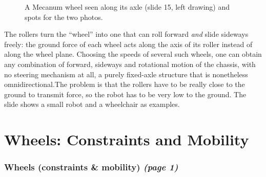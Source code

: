 \documentclass[11pt,a4paper]{article}
\theoremstyle{definition}
\theoremstyle{plain}
\theoremstyle{remark}
\begin{document}
\begin{figure}[H]
\centering
{}
\caption{A Mecanum wheel seen along its axle (slide 15, left drawing) and spots for the two photos.}
\end{figure}

\begin{intuition}
The rollers turn the ``wheel'' into one that can roll forward \emph{and} slide sideways freely: the ground force of each wheel acts along the axis of its roller instead of along the wheel plane. Choosing the speeds of several such wheels, one can obtain any combination of forward, sideways and rotational motion of the chassis, with no steering mechanism at all, a purely fixed-axle structure that is nonetheless omnidirectional.The problem is that the rollers have to be really close to the ground to transmit force, so the robot has to be very low to the ground. The slide shows a small robot and a wheelchair as examples.
\end{intuition}

\part{Wheels: Constraints and Mobility}
 
\section{Wheels (constraints \& mobility) \emph{(page 1)}}
 
\end{document}
